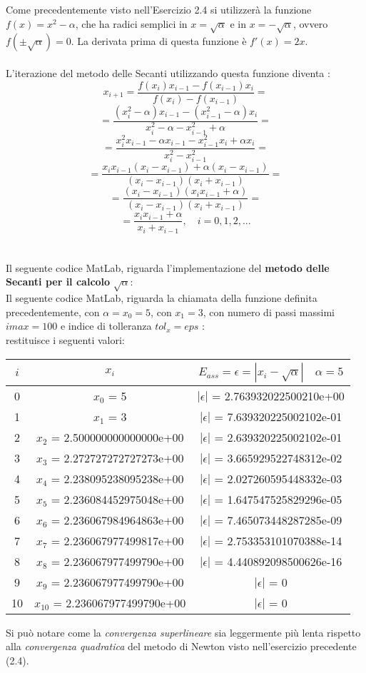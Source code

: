 Come precedentemente visto nell'Esercizio 2.4 si utilizzerà la funzione $f(x) = x^2-\alpha$, che ha radici semplici in $x=\sqrt{\alpha}$ e in $x=-\sqrt{\alpha}$, ovvero $f(\pm\sqrt{\alpha})=0$. La derivata prima di questa funzione è $f'(x)=2x$.\\\\
L'iterazione del metodo delle Secanti utilizzando questa funzione diventa :
	\[
	x_{i+1} = \frac{f(x_i)x_{i-1}-f(x_{i-1})x_i}{f(x_i)-f(x_{i-1})} =
	\]
	\[
	= \frac{(x_i^2-\alpha)x_{i-1}-(x_{i-1}^2-\alpha)x_i}{x_i^2-\alpha-x_{i-1}^2+\alpha}  =
	\]
	\[
	= \frac{x_i^2x_{i-1}-\alpha x_{i-1}-x_{i-1}^2x_i+\alpha x_i}{x_i^2-x_{i-1}^2} =
	\]
	\[
	= \frac{x_ix_{i-1}(x_i-x_{i-1})+\alpha (x_i-x_{i-1})}{(x_i-x_{i-1})(x_i+x_{i-1})} =
	\]
	\[
	= \frac{(x_i-x_{i-1})(x_ix_{i-1}+\alpha)}{(x_i-x_{i-1})(x_i+x_{i-1})} =
	\]
	\[
	= \frac{x_ix_{i-1}+\alpha}{x_i+x_{i-1}},\quad i=0,1,2,...
	\]\\\\
Il seguente codice MatLab, riguarda l'implementazione del \textbf{metodo delle Secanti per il calcolo} $\sqrt{\alpha}$:\\ 
	
Il seguente codice MatLab, riguarda la chiamata della funzione definita precedentemente, con $\alpha=x_0=5$, con $x_1=3$, con numero di passi massimi $imax=100$ e indice di tolleranza $tol_x=eps$ :\\
	
restituisce i seguenti valori:\\
\begin{center}
	\begin{tabular}{|c|c|c|}
		\hline
			$i$ & $x_i$ & $E_{ass}=\epsilon=|x_i-\sqrt{\alpha}| \quad \alpha=5$ \\
		\hline
    		0 & $x_0$ = 5 & $|\epsilon|$ = 2.763932022500210e+00\\
    		1 & $x_1$ = 3 & $|\epsilon|$ = 7.639320225002102e-01\\
    		2 & $x_2$ = 2.500000000000000e+00 & $|\epsilon|$ = 2.639320225002102e-01\\
    		3 & $x_3$ = 2.272727272727273e+00 & $|\epsilon|$ = 3.665929522748312e-02\\
    		4 & $x_4$ = 2.238095238095238e+00 & $|\epsilon|$ = 2.027260595448332e-03\\
    		5 & $x_5$ = 2.236084452975048e+00 & $|\epsilon|$ = 1.647547525829296e-05\\
    		6 & $x_6$ = 2.236067984964863e+00 & $|\epsilon|$ = 7.465073448287285e-09\\
    		7 & $x_7$ = 2.236067977499817e+00 & $|\epsilon|$ = 2.753353101070388e-14\\
    		8 & $x_8$ = 2.236067977499790e+00 & $|\epsilon|$ = 4.440892098500626e-16\\
    		9 & $x_9$ = 2.236067977499790e+00 & $|\epsilon|$ = 0\\
    		10 & $x_{10}$ = 2.236067977499790e+00 & $|\epsilon|$ = 0\\
		\hline
	\end{tabular}
\end{center}
Si può notare come la \textit{convergenza superlineare} sia leggermente più lenta rispetto alla \textit{convergenza quadratica} del metodo di Newton visto nell'esercizio precedente (2.4).